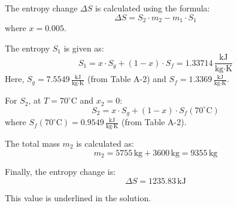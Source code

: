 The entropy change \( \Delta S \) is calculated using the formula:  
\[
\Delta S = S_2 \cdot m_2 - m_1 \cdot S_1
\]  
where \( x = 0.005 \).  

The entropy \( S_1 \) is given as:  
\[
S_1 = x \cdot S_g + (1 - x) \cdot S_f = 1.33714 \, \frac{\text{kJ}}{\text{kg·K}}
\]  
Here, \( S_g = 7.5549 \, \frac{\text{kJ}}{\text{kg·K}} \) (from Table A-2) and \( S_f = 1.3369 \, \frac{\text{kJ}}{\text{kg·K}} \).  

For \( S_2 \), at \( T = 70^\circ\text{C} \) and \( x_2 = 0 \):  
\[
S_2 = x \cdot S_g + (1 - x) \cdot S_f(70^\circ\text{C})
\]  
where \( S_f(70^\circ\text{C}) = 0.9549 \, \frac{\text{kJ}}{\text{kg·K}} \) (from Table A-2).  

The total mass \( m_2 \) is calculated as:  
\[
m_2 = 5755 \, \text{kg} + 3600 \, \text{kg} = 9355 \, \text{kg}
\]  

Finally, the entropy change is:  
\[
\Delta S = 1235.83 \, \text{kJ}
\]  

This value is underlined in the solution.